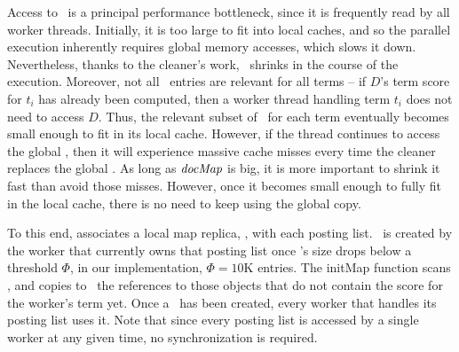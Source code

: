 


Access to \DMap\ is a principal performance bottleneck, since it is frequently read by all worker threads. Initially, it is too large to fit into local caches, and so the parallel execution inherently requires global memory accesses, which slows it down. Nevertheless, 
thanks to the cleaner's work, \DMap\ shrinks in the course of the execution. 
Moreover, not all  \DMap\ entries are relevant for all terms -- if $D$'s term score for $t_i$ has already been computed, then a worker thread handling term $t_i$ does not need to access $D$.
Thus, the relevant subset of  \DMap\ for each term eventually becomes small enough to fit in its local cache. However, if the thread continues to access the global \DMap, then it will experience massive cache misses every time the cleaner replaces the global \DMap. 
As long as $\textit{docMap}$ is big, it is more important to shrink it fast than avoid those misses. However, once it becomes small enough to fully fit in the local cache, there is no need to keep using the global copy. 

To this end, \alg\/ associates a local map replica, \TMap, with each posting list. \TMap\ is created by the worker that currently owns that posting list once \DMap's size drops below a threshold $\Phi$,
in our implementation, $\Phi=10$K entries. The {\sc initMap} function scans \DMap, and copies to \TMap\ the references to those \Docobj{} objects that do not contain the score for the worker's term yet.  Once a \TMap\ has been created, every worker that handles its posting list uses it.
Note that since every posting list is accessed by a single worker at any given time, no synchronization is required.
%

